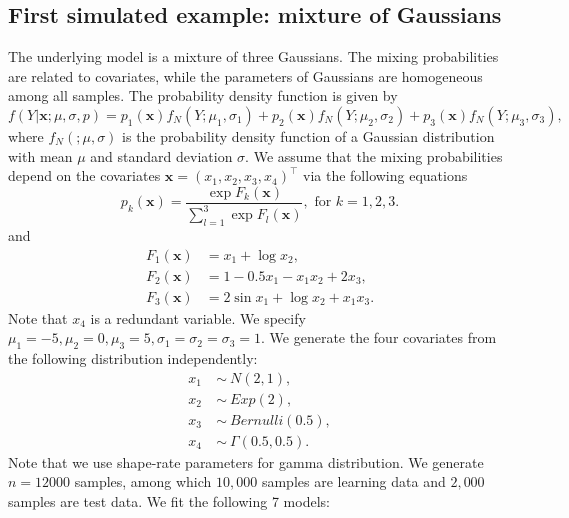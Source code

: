 \documentclass[11pt]{article}
\numberwithin{equation}{section}
\def\bx{\boldsymbol{x}}
\begin{document}
\subsection{First simulated example: mixture of Gaussians}

The underlying model is a mixture of three Gaussians. The mixing probabilities are related to covariates, while the parameters of Gaussians are homogeneous among all samples.
The probability density function is given by
\begin{equation}
f(Y|\bx; \mu,\sigma,p)=p_1(\bx)f_N(Y;\mu_1,\sigma_1)+p_2(\bx)f_N(Y;\mu_2,\sigma_2)+p_3(\bx)f_N(Y;\mu_3,\sigma_3),
\end{equation}
where $f_N(;\mu,\sigma)$ is the probability density function of a Gaussian distribution with mean $\mu$ and standard deviation $\sigma$.
We assume that the mixing probabilities depend on the covariates $\bx=(x_1,x_2,x_3,x_4)^\top$ via the following equations
\begin{equation}\label{logistic}
	p_k(\bx)=\frac{\exp{F_k(\bx)}}{\sum_{l=1}^{3}\exp{F_l(\bx)}}, \text{ for } k=1,2,3.
\end{equation}
and 
\begin{align*}
F_1(\bx)&=x_1+\log x_2,\\
 F_2(\bx)&=1-0.5x_1-x_1x_2+2x_3, \\
  F_3(\bx)&=2\sin x_1+\log x_2 + x_1x_3.
	\end{align*}
Note that $x_4$ is a redundant variable. We specify $\mu_1=-5,\mu_2=0,\mu_3=5, \sigma_1=\sigma_2=\sigma_3=1$. We generate the four covariates from the following distribution independently:
   \begin{align*}
   	x_1~&\sim~ N(2,1),\\
   	x_2~&\sim~ Exp(2), \\
   	x_3~&\sim~ Bernulli(0.5), \\
   	x_4~&\sim~ \Gamma(0.5,0.5).
   \end{align*}
Note that we use shape-rate parameters for gamma distribution.
We generate $n=12000$ samples, among which $10,000$ samples are learning data and $2,000$ samples are test data.
We fit the following 7 models:
\end{document}
